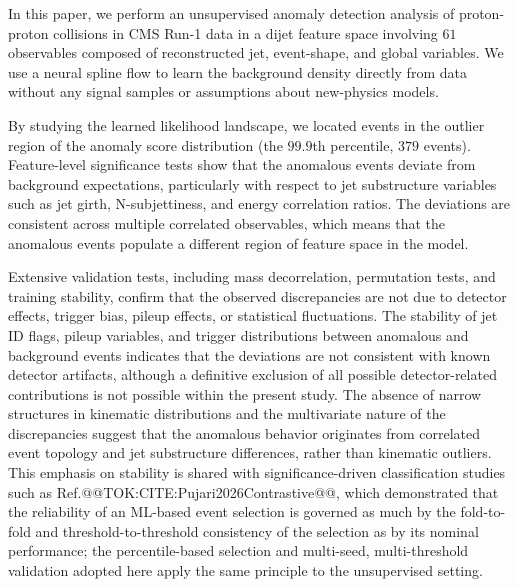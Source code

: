 \documentclass[11pt]{article}
\begin{document}
In this paper, we perform an unsupervised anomaly detection analysis of proton-proton collisions in CMS Run-1 data in a dijet feature space involving $61$ observables composed of reconstructed jet, event-shape, and global variables. We use a neural spline flow to learn the background density directly from data without any signal samples or assumptions about new-physics models.

By studying the learned likelihood landscape, we located events in the outlier region of the anomaly score distribution (the $99.9$th percentile, $379$ events). Feature-level significance tests show that the anomalous events deviate from background expectations, particularly with respect to jet substructure variables such as jet girth, N-subjettiness, and energy correlation ratios. The deviations are consistent across multiple correlated observables, which means that the anomalous events populate a different region of feature space in the model.

Extensive validation tests, including mass decorrelation, permutation tests, and training stability, confirm that the observed discrepancies are not due to detector effects, trigger bias, pileup effects, or statistical fluctuations. The stability of jet ID flags, pileup variables, and trigger distributions between anomalous and background events indicates that the deviations are not consistent with known detector artifacts, although a definitive exclusion of all possible detector-related contributions is not possible within the present study. The absence of narrow structures in kinematic distributions and the multivariate nature of the discrepancies suggest that the anomalous behavior originates from correlated event topology and jet substructure differences, rather than kinematic outliers. This emphasis on stability is shared with significance-driven classification studies such as Ref.@@TOK:CITE:Pujari2026Contrastive@@, which demonstrated that the reliability of an ML-based event selection is governed as much by the fold-to-fold and threshold-to-threshold consistency of the selection as by its nominal performance; the percentile-based selection and multi-seed, multi-threshold validation adopted here apply the same principle to the unsupervised setting.
\end{document}
